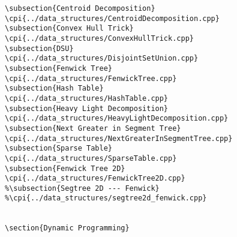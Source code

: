{\begin{verbatim}
\subsection{Centroid Decomposition}
\cpi{../data_structures/CentroidDecomposition.cpp}
\subsection{Convex Hull Trick}
\cpi{../data_structures/ConvexHullTrick.cpp}
\subsection{DSU}
\cpi{../data_structures/DisjointSetUnion.cpp}
\subsection{Fenwick Tree}
\cpi{../data_structures/FenwickTree.cpp}
\subsection{Hash Table}
\cpi{../data_structures/HashTable.cpp}
\subsection{Heavy Light Decomposition}
\cpi{../data_structures/HeavyLightDecomposition.cpp}
\subsection{Next Greater in Segment Tree}
\cpi{../data_structures/NextGreaterInSegmentTree.cpp}
\subsection{Sparse Table}
\cpi{../data_structures/SparseTable.cpp}
\subsection{Fenwick Tree 2D}
\cpi{../data_structures/FenwickTree2D.cpp}
%\subsection{Segtree 2D --- Fenwick}
%\cpi{../data_structures/segtree2d_fenwick.cpp}


\section{Dynamic Programming}


\end{verbatim}}
